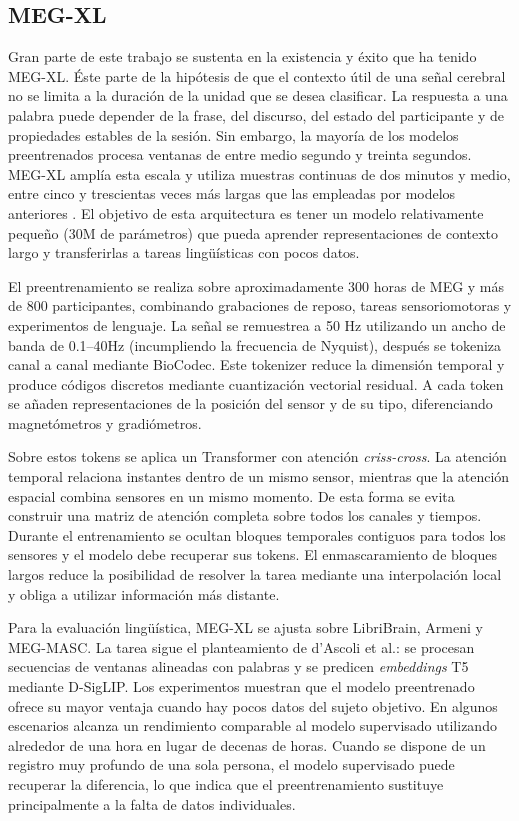 \subsection{MEG-XL}

Gran parte de este trabajo se sustenta en la existencia y éxito que ha tenido MEG-XL. Éste parte de la hipótesis de que el contexto útil de una señal cerebral no se limita a la duración de la unidad que se desea clasificar. La respuesta a una palabra puede depender de la frase, del discurso, del estado del participante y de propiedades estables de la sesión. Sin embargo, la mayoría de los modelos preentrenados procesa ventanas de entre medio segundo y treinta segundos. MEG-XL amplía esta escala y utiliza muestras continuas de dos minutos y medio, entre cinco y trescientas veces más largas que las empleadas por modelos anteriores \cite{jayalath2026megxl}. El objetivo de esta arquitectura es tener un modelo relativamente pequeño (30M de parámetros) que pueda aprender representaciones de contexto largo y transferirlas a tareas lingüísticas con pocos datos. 

El preentrenamiento se realiza sobre aproximadamente 300 horas de MEG y más de 800 participantes, combinando grabaciones de reposo, tareas sensoriomotoras y experimentos de lenguaje. La señal se remuestrea a 50 Hz utilizando un ancho de banda de 0.1--40Hz (incumpliendo la frecuencia de Nyquist), después se tokeniza canal a canal mediante BioCodec. Este tokenizer reduce la dimensión temporal y produce códigos discretos mediante cuantización vectorial residual. A cada token se añaden representaciones de la posición del sensor y de su tipo, diferenciando magnetómetros y gradiómetros.

Sobre estos tokens se aplica un Transformer con atención \textit{criss-cross}. La atención temporal relaciona instantes dentro de un mismo sensor, mientras que la atención espacial combina sensores en un mismo momento. De esta forma se evita construir una matriz de atención completa sobre todos los canales y tiempos. Durante el entrenamiento se ocultan bloques temporales contiguos para todos los sensores y el modelo debe recuperar sus tokens. El enmascaramiento de bloques largos reduce la posibilidad de resolver la tarea mediante una interpolación local y obliga a utilizar información más distante.

Para la evaluación lingüística, MEG-XL se ajusta sobre LibriBrain, Armeni y MEG-MASC. La tarea sigue el planteamiento de d'Ascoli et al.: se procesan secuencias de ventanas alineadas con palabras y se predicen \textit{embeddings} T5 mediante D-SigLIP. Los experimentos muestran que el modelo preentrenado ofrece su mayor ventaja cuando hay pocos datos del sujeto objetivo. En algunos escenarios alcanza un rendimiento comparable al modelo supervisado utilizando alrededor de una hora en lugar de decenas de horas. Cuando se dispone de un registro muy profundo de una sola persona, el modelo supervisado puede recuperar la diferencia, lo que indica que el preentrenamiento sustituye principalmente a la falta de datos individuales.

